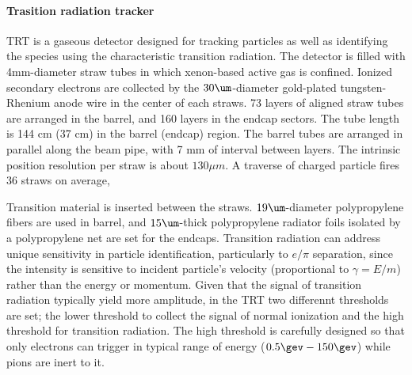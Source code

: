 

\paragraph{Trasition radiation tracker}
TRT is a gaseous detector designed for tracking particles as well as identifying the species using the characteristic transition radiation.
The detector is filled with 4mm-diameter straw tubes in which xenon-based active gas is confined.
Ionized secondary electrons are collected by the $30\um$-diameter gold-plated tungsten-Rhenium anode wire in the center of each straws.
73 layers of aligned straw tubes are arranged in the barrel, and 160 layers in the endcap sectors. 
The tube length is 144 cm (37 cm) in the barrel (endcap) region. 
The barrel tubes are arranged in parallel along the beam pipe, with 7 mm of interval between layers.
The intrinsic position resolution per straw is about $130\mu m$.
A traverse of charged particle fires 36 straws on average, 

Transition material is inserted between the straws.
$19\um$-diameter polypropylene fibers are used in barrel, and $15\um$-thick polypropylene radiator foils isolated by a polypropylene net are set for the endcaps.
Transition radiation can address unique sensitivity in particle identification, particularly to  $e/\pi$ separation, 
since the intensity is sensitive to incident particle's velocity (proportional to $\gamma=E/m$) rather than the energy or momentum. 
Given that the signal of transition radiation typically yield more amplitude, in the TRT two differennt thresholds are set; 
the lower threshold to collect the signal of normal ionization and the high threshold for transition radiation. 
The high threshold is carefully designed so that only electrons can trigger in typical range of energy ($0.5\gev - 150 \gev$) while pions are inert to it. \\

